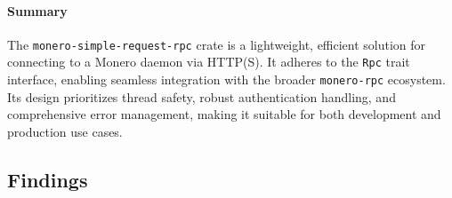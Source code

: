 \documentclass[12pt,a4paper]{article}
\begin{document}
\paragraph{Summary}
The \texttt{monero-simple-request-rpc} crate is a lightweight, efficient solution for connecting to a Monero daemon via HTTP(S).  It adheres to the \texttt{Rpc} trait interface, enabling seamless integration with the broader \texttt{monero-rpc} ecosystem.  Its design prioritizes thread safety, robust authentication handling, and comprehensive error management, making it suitable for both development and production use cases.

\subsection{Findings}
\end{document}
